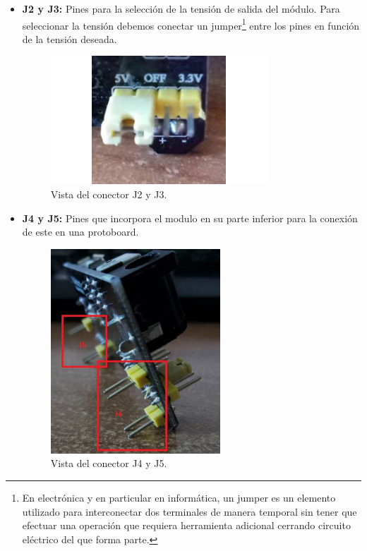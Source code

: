 \begin{itemize}
  \item \textbf{J2 y J3:} Pines para la selección de la tensión de salida del módulo. Para seleccionar la tensión debemos conectar un jumper\footnote{En electrónica y en particular en informática, un jumper
   es un elemento utilizado para interconectar dos terminales de manera temporal sin tener que efectuar una operación que requiera herramienta adicional cerrando circuito eléctrico del que forma parte. } entre los pines en función de la
  tensión deseada.

   \begin{figure}[H]
  \begin{center}
    \includegraphics[scale=0.5]{imagenes/usb_board_vout.png}
  \end{center}
  \caption{Vista del conector J2 y J3.}
  \label{figura:conector_usb_board_vout}
\end{figure}

\item \textbf{J4 y J5:} Pines que incorpora el modulo en su parte inferior para la conexión de este en 
una protoboard.

   \begin{figure}[H]
  \begin{center}
    \includegraphics[scale=0.5]{imagenes/pin_usb_board.png}
  \end{center}
  \caption{Vista del conector J4 y J5.}
  \label{figura:conector_usb_board}
\end{figure}
  
\end{itemize}


